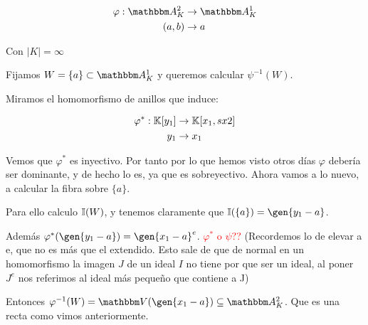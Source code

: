 \begin{example}
	\begin{align*}
	\varphi: \A^2_K & \rightarrow \A^1_K \\
	(a,b) & \rightarrow a
	\end{align*}
	
	Con $|K|=\infty$
	
	Fijamos $W=\{a\} \subset \A_K^1$ y queremos calcular $\psi^{-1}(W)$.
	
	Miramos el homomorfismo de anillos que induce:
	
	\begin{align*}
	\varphi^*: \mathbb{K}[y_1] & \rightarrow \mathbb{K}[x_1,sx2] \\
	y_1 & \rightarrow x_1
	\end{align*}
	
	Vemos que $\varphi^*$ es inyectivo. Por tanto por lo que hemos visto otros días $\varphi$ debería ser dominante, y de hecho lo es, ya que es sobreyectivo. Ahora vamos a lo nuevo, a calcular la fibra sobre $\{a\}$.
	
	Para ello calculo $\mathbb{I}(W)$, y tenemos claramente que $\I(\{a\})=\gen{y_1 -a}$.
	
	Además $\varphi^*(\gen{y_1-a})=\gen{x_1-a}^e$. \textcolor{red}{$\varphi^*$ o $\psi$??} (Recordemos lo de elevar a e, que no es más que el extendido. Esto sale de que de normal en un homomorfismo la imagen $J$ de un ideal $I$ no tiene por que ser un ideal, al poner $J^e$ nos referimos al ideal más pequeño que contiene a J)
	
	Entonces $\varphi^{-1}(W)= \V(\gen{x_1-a}) \subseteq \A^2_K$. Que es una recta como vimos anteriormente.
\end{example}


